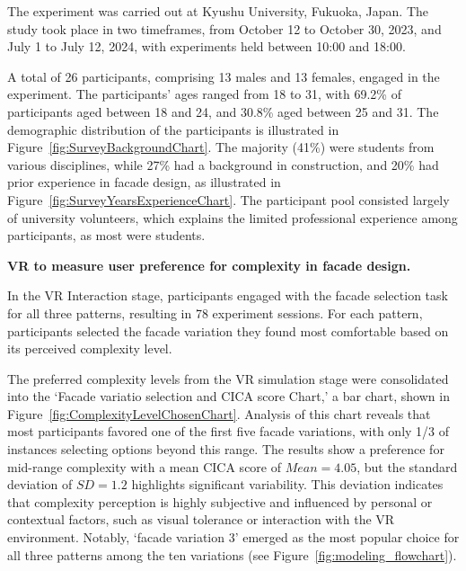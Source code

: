 
The experiment was carried out at Kyushu University, Fukuoka, Japan.
The study took place in two timeframes, from October 12 to October 30, 2023, and July 1 to July 12, 2024, with experiments held between 10:00 and 18:00.

A total of 26 participants, comprising 13 males and 13 females, engaged in the experiment.
The participants' ages ranged from 18 to 31, with 69.2\% of participants aged between 18 and 24, and 30.8\% aged between 25 and 31.
The demographic distribution of the participants is illustrated in Figure~\ref{fig:SurveyBackgroundChart}.
The majority (41\%) were students from various disciplines, while 27\% had a background in construction, and 20\% had prior experience in facade design, as illustrated in Figure~\ref{fig:SurveyYearsExperienceChart}.
The participant pool consisted largely of university volunteers, which explains the limited professional experience among participants, as most were students.

\textbf{VR to measure user preference for complexity in facade design.}

In the VR Interaction stage, participants engaged with the facade selection task for all three patterns, resulting in 78 experiment sessions.
For each pattern, participants selected the facade variation they found most comfortable based on its perceived complexity level.


The preferred complexity levels from the VR simulation stage were consolidated into the `Facade variatio selection and CICA score Chart,' a bar chart, shown in Figure~\ref{fig:ComplexityLevelChosenChart}.
Analysis of this chart reveals that most participants favored one of the first five facade variations, with only 1/3 of instances selecting options beyond this range.
The results show a preference for mid-range complexity with a mean CICA score of \(Mean = 4.05\), but the standard deviation of \(SD = 1.2\) highlights significant variability.
This deviation indicates that complexity perception is highly subjective and influenced by personal or contextual factors, such as visual tolerance or interaction with the VR environment.
Notably, `facade variation 3'  emerged as the most popular choice for all three patterns among the ten variations (see Figure~\ref{fig:modeling_flowchart}).


